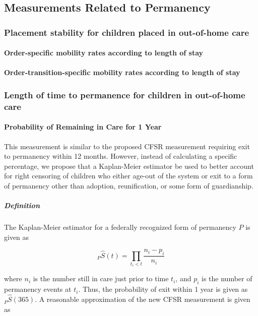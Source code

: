 \documentclass[12pt]{article}\usepackage[]{graphicx}\usepackage[]{color}
\begin{document}
\subsection{Measurements Related to Permanency}

\subsubsection{Placement stability for children placed in out-of-home care}

\paragraph{Order-specific mobility rates according to length of stay}

\paragraph{Order-transition-specific mobility rates according to length of stay}

\subsubsection{Length of time to permanence for children in out-of-home care}

\paragraph{Probability of Remaining in Care for 1 Year} This measurement is similar to the proposed CFSR measurement requiring exit to permanency within 12 months. However, instead of calculating a specific percentage, we propose that a Kaplan-Meier estimator be used to better account for right censoring of children who either age-out of the system or exit to a form of permanency other than adoption, reunification, or some form of guardianship. 
 
\subparagraph{Definition} The Kaplan-Meier estimator for a federally recognized form of permanency $P$ is given as

\begin{equation}\label{eq:KM}
{}_P\hat S(t) = \prod\limits_{t_i<t} \frac{n_i-p_{i}}{n_i}
\end{equation}
 
where $n_{i}$ is the number still in care just prior to time $t_{i}$, and $p_{i}$ is the number of permanency events at $t_{i}$. Thus, the probability of exit within 1 year is given as ${}_P\hat S(365)$. A reasonable approximation of the new CFSR measurement is given as
\end{document}
